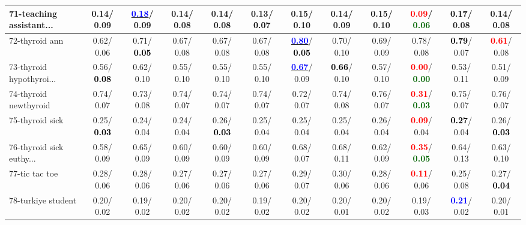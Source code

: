 \begin{table}[h]
\begin{center}
{\begin{tabular}{lc|c|c|c|c|c|c|c|c|c|c}
71-teaching assistant... &   0.14/  0.09 & \underline{\textcolor{blue}{\textbf{  0.18}}}/  0.09 &   0.14/  0.08 &   0.14/  0.08 &   0.13/\textcolor{black}{\textbf{  0.07}} &   0.15/  0.10 &   0.14/  0.09 &   0.15/  0.10 & \textcolor{red}{\textbf{  0.09}}/\textcolor{darkgreen}{\textbf{  0.06}} & \textcolor{black}{\textbf{  0.17}}/  0.08 &   0.14/  0.08 \\ \hline
72-thyroid ann &   0.62/  0.06 &   0.71/\textcolor{black}{\textbf{  0.05}} &   0.67/  0.08 &   0.67/  0.08 &   0.67/  0.08 & \underline{\textcolor{blue}{\textbf{  0.80}}}/\textcolor{black}{\textbf{  0.05}} &   0.70/  0.10 &   0.69/  0.09 &   0.78/  0.08 & \textcolor{black}{\textbf{  0.79}}/  0.07 & \textcolor{red}{\textbf{  0.61}}/  0.08 \\
73-thyroid hypothyroi... &   0.56/\textcolor{black}{\textbf{  0.08}} &   0.62/  0.10 &   0.55/  0.10 &   0.55/  0.10 &   0.55/  0.10 & \underline{\textcolor{blue}{\textbf{  0.67}}}/  0.09 & \textcolor{black}{\textbf{  0.66}}/  0.10 &   0.57/  0.10 & \textcolor{red}{\textbf{  0.00}}/\textcolor{darkgreen}{\textbf{  0.00}} &   0.53/  0.11 &   0.51/  0.09 \\
74-thyroid newthyroid &   0.74/  0.07 &   0.73/  0.08 &   0.74/  0.07 &   0.74/  0.07 &   0.74/  0.07 &   0.72/  0.07 &   0.74/  0.08 &   0.76/  0.07 & \textcolor{red}{\textbf{  0.31}}/\textcolor{darkgreen}{\textbf{  0.03}} &   0.75/  0.07 &   0.76/  0.07 \\
75-thyroid sick &   0.25/\textcolor{black}{\textbf{  0.03}} &   0.24/  0.04 &   0.24/  0.04 &   0.26/\textcolor{black}{\textbf{  0.03}} &   0.25/  0.04 &   0.25/  0.04 &   0.25/  0.04 &   0.26/  0.04 & \textcolor{red}{\textbf{  0.09}}/  0.04 & \textcolor{black}{\textbf{  0.27}}/  0.04 &   0.26/\textcolor{black}{\textbf{  0.03}} \\
76-thyroid sick euthy... &   0.58/  0.09 &   0.65/  0.09 &   0.60/  0.09 &   0.60/  0.09 &   0.60/  0.09 &   0.68/  0.07 &   0.68/  0.11 &   0.62/  0.09 & \textcolor{red}{\textbf{  0.35}}/\textcolor{darkgreen}{\textbf{  0.05}} &   0.64/  0.13 &   0.63/  0.10 \\
77-tic tac toe &   0.28/  0.06 &   0.28/  0.06 &   0.27/  0.06 &   0.27/  0.06 &   0.27/  0.06 &   0.29/  0.07 &   0.30/  0.06 &   0.28/  0.06 & \textcolor{red}{\textbf{  0.11}}/  0.06 &   0.25/  0.08 &   0.27/\textcolor{black}{\textbf{  0.04}} \\
78-turkiye student &   0.20/  0.02 &   0.19/  0.02 &   0.20/  0.02 &   0.20/  0.02 &   0.19/  0.02 &   0.20/  0.02 &   0.20/  0.01 &   0.20/  0.02 &   0.19/  0.03 & \textcolor{blue}{\textbf{  0.21}}/  0.02 &   0.20/  0.01 \\ \hline

\end{tabular}}
\end{center}
\end{table}

